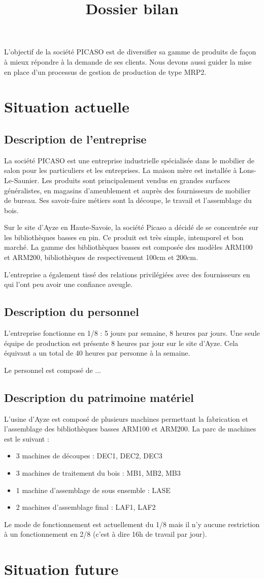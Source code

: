 \documentclass[a4paper]{TPInsa}
\title{Dossier bilan}
\begin{document}
	\pageTitre
	\tableMatieres

		L'objectif de la société PICASO est de diversifier sa gamme de produits de façon à mieux répondre à la demande de ses clients. Nous devons aussi guider la mise en place d'un processus de gestion de production de type MRP2.	
	
	\section{Situation actuelle}
	
	\subsection{Description de l'entreprise}
	
	La société PICASO est une entreprise industrielle spécialisée dans le mobilier de salon pour les particuliers et les entreprises. La maison mère est installée à Lons-Le-Saunier. Les produits sont principalement vendus en grandes surfaces généralistes, en magasins d'ameublement et auprès des fournisseurs de mobilier de bureau. Ses savoir-faire métiers sont la découpe, le travail et l'assemblage du bois.
	
	Sur le site d'Ayze en Haute-Savoie, la société Picaso a décidé de se concentrée sur les bibliothèques basses en pin. Ce produit est très simple, intemporel et bon marché. La gamme des bibliothèques basses est composée des modèles ARM100 et ARM200, bibliothèques de respectivement 100cm et 200cm.  
	
	
	L'entreprise a également tissé des relations privilégiées avec des fournisseurs en qui l'ont peu avoir une confiance aveugle. 
	
	\subsection{Description du personnel}
	L'entreprise fonctionne en 1/8 : 5 jours par semaine, 8 heures par jours. Une seule équipe de production est présente 8 heures par jour sur le site d'Ayze. Cela équivaut a un total de 40 heures par personne à la semaine. 
	
	Le personnel est composé de ... %
	\subsection{Description du patrimoine matériel}
	L'usine d'Ayze est composé de plusieurs machines permettant la fabrication et l'assemblage des bibliothèques basses ARM100 et ARM200. 
	La parc de machines est le suivant :
	\begin{itemize}
	\item 3 machines de découpes : DEC1, DEC2, DEC3
	\item 3 machines de traitement du bois : MB1, MB2, MB3
	\item 1 machine d'assemblage de sous ensemble : LASE
	\item 2 machines d'assemblage final : LAF1, LAF2
	\end{itemize}
	
	Le mode de fonctionnement est actuellement du 1/8 mais il n'y aucune restriction à un fonctionnement en 2/8 (c'est à dire 16h de travail par jour).
	\section{Situation future}
	
\end{document}
